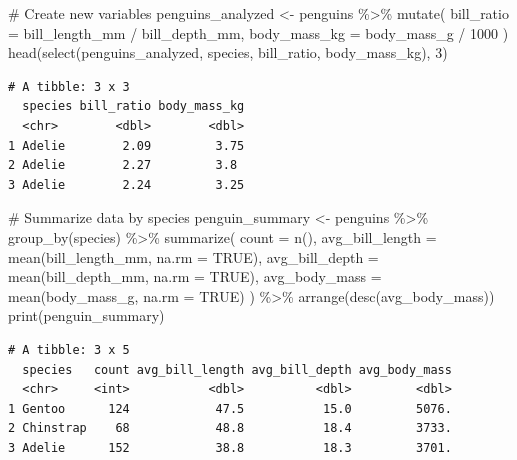 \documentclass[
  letterpaper,
]{book}
\newenvironment{Shaded}{\begin{snugshade}}{\end{snugshade}}
\newcommand{\AttributeTok}[1]{\textcolor[rgb]{0.40,0.45,0.13}{#1}}
\newcommand{\CommentTok}[1]{\textcolor[rgb]{0.37,0.37,0.37}{#1}}
\newcommand{\ConstantTok}[1]{\textcolor[rgb]{0.56,0.35,0.01}{#1}}
\newcommand{\DecValTok}[1]{\textcolor[rgb]{0.68,0.00,0.00}{#1}}
\newcommand{\FunctionTok}[1]{\textcolor[rgb]{0.28,0.35,0.67}{#1}}
\newcommand{\NormalTok}[1]{\textcolor[rgb]{0.00,0.23,0.31}{#1}}
\newcommand{\OtherTok}[1]{\textcolor[rgb]{0.00,0.23,0.31}{#1}}
\newcommand{\SpecialCharTok}[1]{\textcolor[rgb]{0.37,0.37,0.37}{#1}}
\begin{document}
\begin{Shaded}
\begin{Highlighting}[]
\CommentTok{\# Create new variables}
\NormalTok{penguins\_analyzed }\OtherTok{\textless{}{-}}\NormalTok{ penguins }\SpecialCharTok{\%\textgreater{}\%}
  \FunctionTok{mutate}\NormalTok{(}
    \AttributeTok{bill\_ratio =}\NormalTok{ bill\_length\_mm }\SpecialCharTok{/}\NormalTok{ bill\_depth\_mm,}
    \AttributeTok{body\_mass\_kg =}\NormalTok{ body\_mass\_g }\SpecialCharTok{/} \DecValTok{1000}
\NormalTok{  )}
\FunctionTok{head}\NormalTok{(}\FunctionTok{select}\NormalTok{(penguins\_analyzed, species, bill\_ratio, body\_mass\_kg), }\DecValTok{3}\NormalTok{)}
\end{Highlighting}
\end{Shaded}

\begin{verbatim}
# A tibble: 3 x 3
  species bill_ratio body_mass_kg
  <chr>        <dbl>        <dbl>
1 Adelie        2.09         3.75
2 Adelie        2.27         3.8 
3 Adelie        2.24         3.25
\end{verbatim}

\begin{Shaded}
\begin{Highlighting}[]
\CommentTok{\# Summarize data by species}
\NormalTok{penguin\_summary }\OtherTok{\textless{}{-}}\NormalTok{ penguins }\SpecialCharTok{\%\textgreater{}\%}
  \FunctionTok{group\_by}\NormalTok{(species) }\SpecialCharTok{\%\textgreater{}\%}
  \FunctionTok{summarize}\NormalTok{(}
    \AttributeTok{count =} \FunctionTok{n}\NormalTok{(),}
    \AttributeTok{avg\_bill\_length =} \FunctionTok{mean}\NormalTok{(bill\_length\_mm, }\AttributeTok{na.rm =} \ConstantTok{TRUE}\NormalTok{),}
    \AttributeTok{avg\_bill\_depth =} \FunctionTok{mean}\NormalTok{(bill\_depth\_mm, }\AttributeTok{na.rm =} \ConstantTok{TRUE}\NormalTok{),}
    \AttributeTok{avg\_body\_mass =} \FunctionTok{mean}\NormalTok{(body\_mass\_g, }\AttributeTok{na.rm =} \ConstantTok{TRUE}\NormalTok{)}
\NormalTok{  ) }\SpecialCharTok{\%\textgreater{}\%}
  \FunctionTok{arrange}\NormalTok{(}\FunctionTok{desc}\NormalTok{(avg\_body\_mass))}
\FunctionTok{print}\NormalTok{(penguin\_summary)}
\end{Highlighting}
\end{Shaded}

\begin{verbatim}
# A tibble: 3 x 5
  species   count avg_bill_length avg_bill_depth avg_body_mass
  <chr>     <int>           <dbl>          <dbl>         <dbl>
1 Gentoo      124            47.5           15.0         5076.
2 Chinstrap    68            48.8           18.4         3733.
3 Adelie      152            38.8           18.3         3701.
\end{verbatim}
\end{document}
